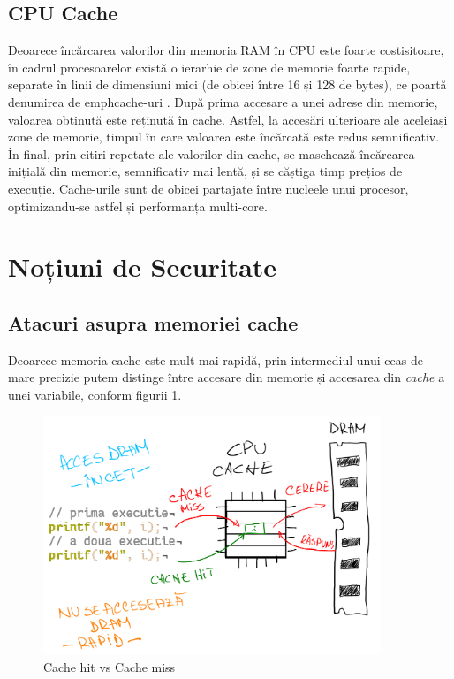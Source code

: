 \subsection{CPU Cache}

Deoarece încărcarea valorilor din memoria RAM în CPU este foarte costisitoare,
în cadrul procesoarelor există o ierarhie de zone de memorie foarte rapide,
separate în linii de dimensiuni mici (de obicei între 16 și 128 de bytes), ce
poartă denumirea de emph{cache-uri} \cite{caching}. După prima accesare a unei
adrese din memorie, valoarea obținută este reținută în cache. Astfel, la
accesări ulterioare ale aceleiași zone de memorie, timpul în care valoarea este
încărcată este redus semnificativ. În final, prin citiri repetate ale valorilor
din cache, se maschează încărcarea inițială din memorie, semnificativ mai
lentă, și se căștiga timp prețios de execuție. Cache-urile sunt de obicei
partajate între nucleele unui procesor, optimizandu-se astfel și performanța
multi-core.

\section{Noțiuni de Securitate}

\subsection{Atacuri asupra memoriei cache}\label{sec:atacuri_cache}

Deoarece memoria cache este mult mai rapidă, prin intermediul unui ceas de mare precizie
putem distinge între accesare din memorie și accesarea din \emph{cache} a unei variabile,
conform figurii \ref{fig:cache_hit}.

\begin{figure}[ht]
	\centering
	\includegraphics[width=0.9\textwidth]{images/cache_hit.png}
	\caption{Cache hit vs Cache miss}
  \label{fig:cache_hit}
\end{figure}

